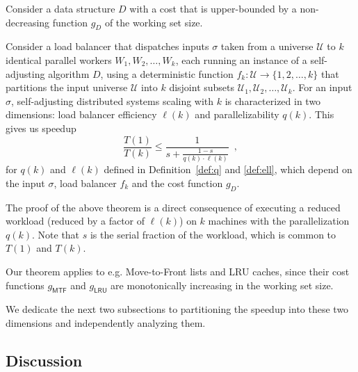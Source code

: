 \begin{theorem}
	\label{thm:superlinear}
	Consider a data structure $D$ with a cost that is upper-bounded by a non-decreasing function $g_D$ of the working set size.

	Consider a load balancer that dispatches inputs $\sigma$ taken from a universe $\mathcal{U}$ to $k$ identical parallel workers $W_1, W_2, \ldots, W_k$, each running an instance of a self-adjusting algorithm $D$, using a deterministic function $f_k : \mathcal{U} \to \{1, 2, \ldots, k\}$ that partitions the input universe $\mathcal{U}$ into $k$ disjoint subsets $\mathcal{U}_1, \mathcal{U}_2, \ldots, \mathcal{U}_k$. 
For an input $\sigma$, self-adjusting distributed systems scaling with $k$ is characterized in two dimensions: 
load balancer efficiency $\ell(k)$ and parallelizability $q(k)$.
This gives us speedup
\begin{equation*}\label{eq:mtf-perf}
  \frac{T(1)}{T(k)} \le \frac1{s + \frac{1-s}{q(k) \cdot \ell(k)}} \enspace ,
\end{equation*}
for $q(k)$ and $\ell(k)$ defined in Definition~\ref{def:q} and \ref{def:ell}, which depend on the input $\sigma$, load balancer $f_k$ and the cost function $g_D$.
\end{theorem}

The proof of the above theorem is a direct consequence of executing a reduced workload (reduced by a factor of $\ell(k)$) on $k$ machines with the parallelization $q(k)$. 
Note that $s$ is the serial fraction of the workload, which is common to $T(1)$ and $T(k)$.

Our theorem applies to e.g. Move-to-Front lists and LRU caches, since their cost functions $g_\textsf{MTF}$ and $g_\textsf{LRU}$ are monotonically increasing in the working set size.

We dedicate the next two subsections to partitioning the speedup into these two dimensions and independently analyzing them.




\subsection{Discussion}


